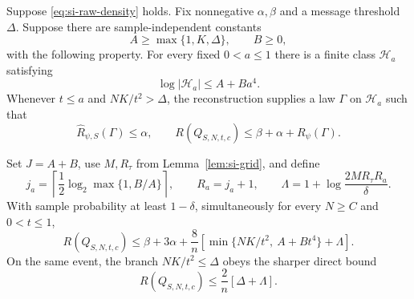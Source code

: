 \begin{theorem}
\label{thm:si-envelope}
Suppose \eqref{eq:si-raw-density} holds. Fix nonnegative $\alpha,\beta$
and a message threshold $\Delta$. Suppose there are sample-independent
constants
\[
 A\ge\max\{1,K,\Delta\},\qquad B\ge0,
\]
with the following property. For every fixed $0<a\le1$ there is a finite
class $\mathcal H_a$ satisfying
\begin{equation}\label{eq:si-class}
 \log|\mathcal H_a|\le A+Ba^4.
\end{equation}
Whenever $t\le a$ and $NK/t^2>\Delta$, the reconstruction supplies a law
$\Gamma$ on $\mathcal H_a$ such that
\begin{equation}\label{eq:si-comparison}
 \widehat R_{\psi,S}(\Gamma)\le\alpha,
 \qquad
 R(Q_{S,N,t,c})\le\beta+\alpha+R_\psi(\Gamma).
\end{equation}

Set $J=A+B$, use $M,R_\tau$ from Lemma~\ref{lem:si-grid}, and define
\[
 j_a=\left\lceil\frac12\log_2\max\{1,B/A\}\right\rceil,
 \qquad R_a=j_a+1,
 \qquad
 \Lambda=1+\log\frac{2MR_\tau R_a}{\delta}.
\]
With sample probability at least $1-\delta$, simultaneously for every
$N\ge C$ and $0<t\le1$,
\begin{equation}\label{eq:si-envelope}
 R(Q_{S,N,t,c})
 \le\beta+3\alpha+
   \frac8n\left[\min\{NK/t^2,\ A+Bt^4\}+\Lambda\right].
\end{equation}
On the same event, the branch $NK/t^2\le\Delta$ obeys the sharper direct
bound
\begin{equation}\label{eq:si-small}
 R(Q_{S,N,t,c})\le\frac2n[\Delta+\Lambda].
\end{equation}
\end{theorem}
